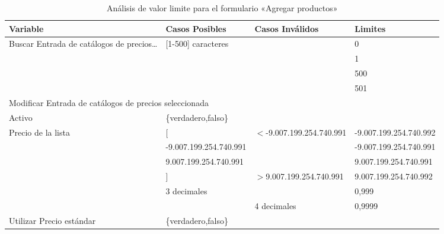 \begin{table}[H]
\centering
\begin{tabular}{|p{3.0cm}|p{4.0cm}|p{4.0cm}|l|}
\hline
\footnotesize{\textbf{Variable}} & \footnotesize{\textbf{Casos Posibles}} & \footnotesize{\textbf{Casos Inválidos}} & \footnotesize{\textbf{Limites}} \\
\hline
\footnotesize{Buscar Entrada de catálogos de precios\ldots} & \footnotesize{[1-500] caracteres} & & \footnotesize{0} \\
& & & \footnotesize{1} \\
& & & \footnotesize{500} \\
& & & \footnotesize{501} \\
\hline
\multicolumn{4}{|l|}{\footnotesize{Modificar Entrada de catálogos de precios seleccionada}} \\
\hline
\footnotesize{Activo} & \footnotesize{\{verdadero,falso\}} & & \\
\hline
\footnotesize{Precio de la lista} & \footnotesize{[} & \footnotesize{$<$-9.007.199.254.740.991} & \footnotesize{-9.007.199.254.740.992} \\
& \footnotesize{-9.007.199.254.740.991} & & \footnotesize{-9.007.199.254.740.991} \\
& \footnotesize{9.007.199.254.740.991} & & \footnotesize{9.007.199.254.740.991} \\
& \footnotesize{]} & \footnotesize{$>$9.007.199.254.740.991} & \footnotesize{9.007.199.254.740.992} \\
& \footnotesize{3 decimales} & & \footnotesize{0,999} \\
& & \footnotesize{4 decimales} & \footnotesize{0,9999} \\
\hline
\footnotesize{Utilizar Precio estándar} & \footnotesize{\{verdadero,falso\}} & & \\
\hline
\end{tabular}
\caption{Análisis de valor limite para el formulario «Agregar productos»}
\label{myers_06}
\end{table}

